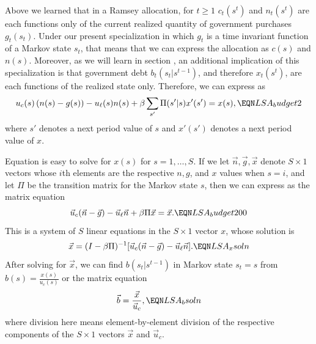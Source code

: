 Above we learned that   in a Ramsey allocation, for $t \geq 1$
 $c_t(s^t)$ and $n_t(s^t)$ are each functions only of the current realized quantity of
government purchases $g_t(s_t)$.
Under our present specialization in which $g_t$ is a time invariant function of a Markov
state $s_t$, that means that we can express the allocation as
$c(s)$ and $n(s)$. Moreover, as we will learn in
section , an additional implication of this
specialization is that government debt $b_t(s_t|s^{t-1})$, and
therefore  $x_t(s^t)$, are each functions of the realized state only.
Therefore,
we can express  as
$$  u_c(s)\left(n(s) - g(s)\right) - u_\ell(s) n(s)  + \beta \sum_{s'} \Pi(s' | s) x'(s')  =  x(s), \EQN LSA_budget2 $$
where $s'$ denotes a next period value of $s$ and $x'(s')$ denotes a next period value of $x$.


Equation  is easy to solve for $x(s)$ for $s = 1, \ldots , S$.
If we let $\vec n, \vec g, \vec x$ denote $S \times 1$ vectors whose $i$th elements are the respective $n, g$, and $x$ values when $s=i$, and
let $\Pi$ be the transition matrix for the Markov state $s$, then
we can express  as the matrix equation
$$ \vec u_c(\vec n - \vec g) -\vec u_\ell \vec n  + \beta \Pi \vec x = \vec x . \EQN LSA_budget200 $$ %
This is a system of $S$ linear equations in the $S \times 1$ vector $x$, whose solution is %
$$ \vec x= (I - \beta \Pi )^{-1} [ \vec u_c (\vec n-\vec g) - \vec u_\ell \vec n] . \EQN LSA_xsoln $$
After solving  for $\vec x$, we can find $b(s_t|s^{t-1})$ in Markov state $s_t=s$
from $ b(s) = {\frac{x(s)}{u_c(s)}} $ or
the matrix equation
$$ \vec b = {\frac{ \vec x }{\vec u_c}} ,  \EQN LSA_bsoln $$
where division here means element-by-element division of the respective components of the $S \times 1$ vectors $\vec x$ and $\vec u_c$.


